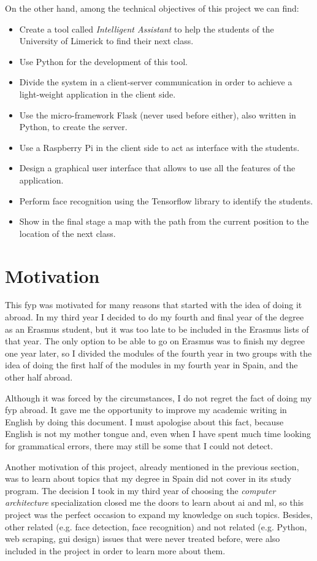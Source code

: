 On the other hand, among the technical objectives of this project we can find:
\begin{itemize}
	\item Create a tool called \textit{Intelligent Assistant} to help the students of the University of Limerick to find their next class.
	\item Use Python for the development of this tool.
	\item Divide the system in a client-server communication in order to achieve a light-weight application in the client side.
	\item Use the micro-framework Flask (never used before either), also written in Python, to create the server.
	\item Use a Raspberry Pi in the client side to act as interface with the students.
	\item Design a graphical user interface that allows to use all the features of the application.
	\item Perform face recognition using the Tensorflow library to identify the students.
	\item Show in the final stage a map with the path from the current position to the location of the next class.
\end{itemize}

\section{Motivation}
This \gls{fyp} was motivated for many reasons that started with the idea of doing it abroad. In my third year I decided to do my fourth and final year of the degree as an Erasmus student, but it was too late to be included in the Erasmus lists of that year. The only option to be able to go on Erasmus was to finish my degree one year later, so I divided the modules of the fourth year in two groups with the idea of doing the first half of the modules in my fourth year in Spain, and the other half abroad. 

Although it was forced by the circumstances, I do not regret the fact of doing my \gls{fyp} abroad. It gave me the opportunity to improve my academic writing in English by doing this document. I must apologise about this fact, because English is not my mother tongue and, even when I have spent much time looking for grammatical errors, there may still be some that I could not detect.

Another motivation of this project, already mentioned in the previous section, was to learn about topics that my degree in Spain did not cover in its study program. The decision I took in my third year of choosing the \textit{computer architecture} specialization closed me the doors to learn about \gls{ai} and \gls{ml}, so this project was the perfect occasion to expand my knowledge on such topics. Besides, other related (e.g. face detection, face recognition) and not related (e.g. Python, web \gls{scraping}, \gls{gui} design) issues that were never treated before, were also included in the project in order to learn more about them. 

